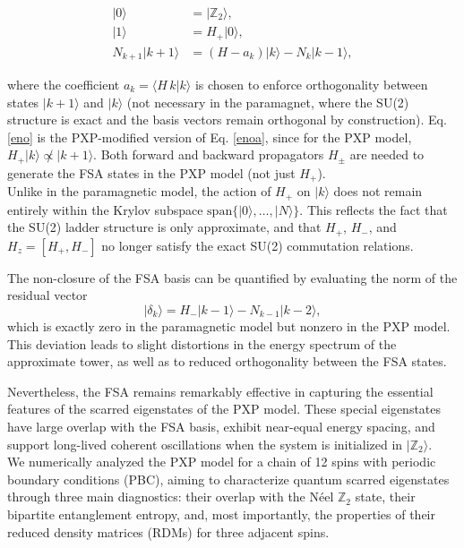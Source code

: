 \documentclass{article}
\begin{document}
\begin{align}
|0\rangle &= |\mathbb{Z}_2\rangle, \\
|1\rangle &= H_+ |0\rangle, \\
N_{k+1}|k+1\rangle &= \left(H - a_k\right) |k\rangle - N_k |k-1\rangle, \label{eno}
\end{align}

where the coefficient \( a_k = \langle H \, k | k \rangle \) is chosen to enforce orthogonality between states $|k+1\rangle$ and $|k\rangle$ (not necessary in the paramagnet, where the SU(2) structure is exact and the basis vectors remain orthogonal by construction). 
Eq. \eqref{eno} is the PXP-modified version of Eq. \eqref{enoa}, since for the PXP model, $H_+ |k\rangle \not\propto |k+1\rangle$. Both forward and backward propagators $H_{\pm}$ are needed to generate the FSA states  in the PXP model (not just $H_+$).\\
Unlike in the paramagnetic model, the action of \( H_+ \) on \( |k\rangle \) does not remain entirely within the Krylov subspace \( \mathrm{span}\{ |0\rangle, \dots, |N\rangle \} \). This reflects the fact that the SU(2) ladder structure is only approximate, and that \( H_+ \), \( H_- \), and \( H_z = [H_+, H_-] \) no longer satisfy the exact SU(2) commutation relations.

The non-closure of the FSA basis can be quantified by evaluating the norm of the residual vector
\begin{equation}
|\delta_k\rangle = H_- |k-1\rangle - N_{k-1} |k-2\rangle,
\end{equation}
which is exactly zero in the paramagnetic model but nonzero in the PXP model. This deviation leads to slight distortions in the energy spectrum of the approximate tower, as well as to reduced orthogonality between the FSA states.

Nevertheless, the FSA remains remarkably effective in capturing the essential features of the scarred eigenstates of the PXP model. These special eigenstates have large overlap with the FSA basis, exhibit near-equal energy spacing, and support long-lived coherent oscillations when the system is initialized in \( |\mathbb{Z}_2\rangle \).\\

We numerically analyzed the PXP model for a chain of 12 spins with periodic boundary conditions (PBC), aiming to characterize quantum scarred eigenstates through three main diagnostics: their overlap with the Néel \( \mathbb{Z}_2 \) state, their bipartite entanglement entropy, and, most importantly, the properties of their reduced density matrices (RDMs) for three adjacent spins.
\end{document}
